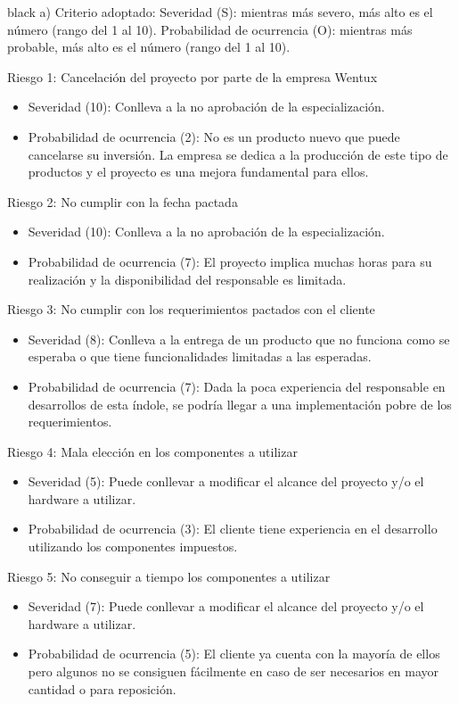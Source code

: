 \documentclass[11pt]{charter}
\begin{document}
\begin{consigna}{black}
a) Criterio adoptado:
Severidad (S): mientras más severo, más alto es el número (rango del 1 al 10).
Probabilidad de ocurrencia (O): mientras más probable, más alto es el número (rango del 1 al 10).

Riesgo 1: Cancelación del proyecto por parte de la empresa Wentux
\begin{itemize}
\item Severidad (10): Conlleva a la no aprobación de la especialización.
\item Probabilidad de ocurrencia (2): No es un producto nuevo que puede cancelarse su inversión. La empresa se dedica a la producción de este tipo de productos y el proyecto es una mejora fundamental para ellos.
\end{itemize}   

Riesgo 2: No cumplir con la fecha pactada
\begin{itemize}
\item Severidad (10): Conlleva a la no aprobación de la especialización.
\item Probabilidad de ocurrencia (7): El proyecto implica muchas horas para su realización y la disponibilidad del responsable \authorname {} es limitada.
\end{itemize}   

Riesgo 3: No cumplir con los requerimientos pactados con el cliente
\begin{itemize}
\item Severidad (8): Conlleva a la entrega de un producto que no funciona como se esperaba o que tiene funcionalidades limitadas a las esperadas.
\item Probabilidad de ocurrencia (7): Dada la poca experiencia del responsable \authorname {} en desarrollos de esta índole, se podría llegar a una implementación pobre de los requerimientos.
\end{itemize}   

Riesgo 4: Mala elección en los componentes a utilizar
\begin{itemize}
\item Severidad (5): Puede conllevar a modificar el alcance del proyecto y/o el hardware a utilizar.
\item Probabilidad de ocurrencia (3): El cliente \clientename {} tiene experiencia en el desarrollo utilizando los componentes impuestos. 
\end{itemize}   

Riesgo 5: No conseguir a tiempo los componentes a utilizar
\begin{itemize}
\item Severidad (7): Puede conllevar a modificar el alcance del proyecto y/o el hardware a utilizar.
\item Probabilidad de ocurrencia (5): El cliente \clientename {} ya cuenta con la mayoría de ellos pero algunos no se consiguen fácilmente en caso de ser necesarios en mayor cantidad o para reposición. 
\end{itemize}   


\end{consigna}
\end{document}
